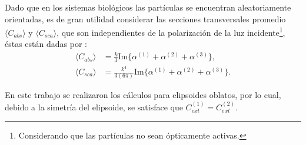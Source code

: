 Dado que en los sistemas biológicos las partículas se encuentran aleatoriamente orientadas, es de gran utilidad considerar las secciones transversales promedio $\langle C_{abs}\rangle$ y $\langle C_{sca}\rangle$, que son independientes de la polarización de la luz incidente\footnote{Considerando que las partículas no sean ópticamente activas.}, éstas están dadas por \cite{Bohren}:
\begin{align*}
	\langle C_{abs}\rangle &= \frac{k}{3} \text{Im}\{\alpha^{(1)}+\alpha^{(2)}+\alpha^{(3)}\},\\
	\langle C_{sca}\rangle &= \frac{k^4}{3(6\pi)} \text{Im}\{\alpha^{(1)}+\alpha^{(2)}+\alpha^{(3)}\}.
\end{align*}

En este trabajo se realizaron los cálculos para elipsoides oblatos, por lo cual, debido a la simetría del elipsoide, se satisface que $C_{ext}^{(1)}=C_{ext}^{(2)}$. 

